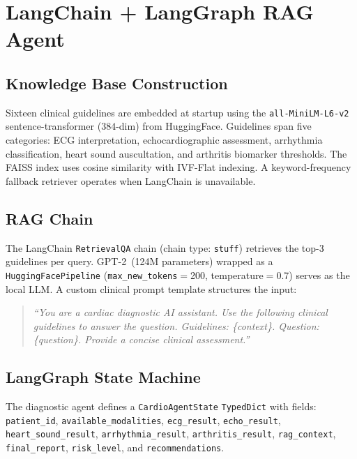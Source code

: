 \documentclass[journal,10pt,twoside]{IEEEtran}
\begin{document}
\section{LangChain + LangGraph RAG Agent}
\label{sec:langgraph}

\subsection{Knowledge Base Construction}

Sixteen clinical guidelines are embedded at startup using the
\texttt{all-MiniLM-L6-v2} sentence-transformer ($384$-dim) from HuggingFace.
Guidelines span five categories: ECG interpretation, echocardiographic assessment,
arrhythmia classification, heart sound auscultation, and arthritis biomarker
thresholds.
The FAISS index uses cosine similarity with IVF-Flat indexing.
A keyword-frequency fallback retriever operates when LangChain is unavailable.

\subsection{RAG Chain}

The LangChain \texttt{RetrievalQA} chain (chain type: \texttt{stuff}) retrieves the
top-3 guidelines per query.
GPT-2~(124M parameters) wrapped as a \texttt{HuggingFacePipeline}
(\texttt{max\_new\_tokens}$=$200, temperature$=$0.7) serves as the local LLM.
A custom clinical prompt template structures the input:
\begin{quote}\small\itshape
``You are a cardiac diagnostic AI assistant. Use the following clinical
guidelines to answer the question. Guidelines: \{context\}. Question: \{question\}.
Provide a concise clinical assessment.''
\end{quote}

\subsection{LangGraph State Machine}

The diagnostic agent defines a \texttt{CardioAgentState} \texttt{TypedDict} with
fields: \texttt{patient\_id}, \texttt{available\_modalities},
\texttt{ecg\_result}, \texttt{echo\_result}, \texttt{heart\_sound\_result},
\texttt{arrhythmia\_result}, \texttt{arthritis\_result}, \texttt{rag\_context},
\texttt{final\_report}, \texttt{risk\_level}, and \texttt{recommendations}.
\end{document}
